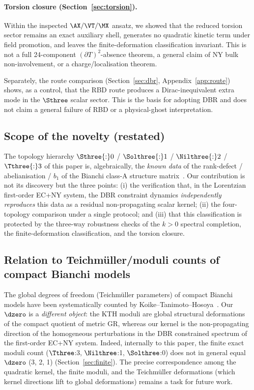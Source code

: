\paragraph{Torsion closure (Section~\ref{sec:torsion}).}
Within the inspected $\AX/\VT/\MX$ ansatz, we showed that the reduced torsion
sector remains an exact auxiliary shell, generates no quadratic kinetic term
under field promotion, and leaves the finite-deformation classification
invariant.  This is not a full 24-component $(\partial T)^{2}$-absence theorem, a
general claim of NY bulk non-involvement, or a charge/localisation theorem.

\medskip
Separately, the route comparison (Section~\ref{sec:dbr},
Appendix~\ref{app:route}) shows, as a control, that the RBD route produces a
Dirac-inequivalent extra mode in the $\Sthree$ scalar sector.  This is the basis
for adopting DBR and does not claim a general failure of RBD or a physical-ghost
interpretation.

\subsection{Scope of the novelty (restated)}
\label{sec:discussion:novelty}

The topology hierarchy $\Sthree{:}0$ / $\Solthree{:}1$ / $\Nilthree{:}2$ /
$\Tthree{:}3$ of this paper is, algebraically, the \emph{known data} of the
rank-defect / abelianisation / $b_{1}$ of the Bianchi class-A structure
matrix~\cite{ref16,ref41,ref42}.  Our contribution is not its discovery but the three
points: (i) the verification that, in the Lorentzian first-order EC+NY system,
the DBR constraint dynamics \emph{independently reproduces} this data as a
residual non-propagating scalar kernel; (ii) the four-topology comparison under a
single protocol; and (iii) that this classification is protected by the
three-way robustness checks of the $k>0$ spectral completion, the
finite-deformation classification, and the torsion closure.

\subsection{Relation to Teichm\"uller/moduli counts of compact Bianchi models}
\label{sec:discussion:teichmuller}

The global degrees of freedom (Teichm\"uller parameters) of compact Bianchi
models have been systematically counted by
Koike--Tanimoto--Hosoya~\cite{ref24,ref25,ref26}.  Our $\dzero$ is a
\emph{different object}: the KTH moduli are global structural deformations of the
compact quotient of metric GR, whereas our kernel is the non-propagating
direction of the homogeneous perturbations in the DBR constrained spectrum of the
first-order EC+NY system.  Indeed, internally to this paper, the finite exact
moduli count ($\Tthree$:3, $\Nilthree$:1, $\Solthree$:0) does not in general equal
$\dzero$ (3, 2, 1) (Section~\ref{sec:finite}).  The precise correspondence among
the quadratic kernel, the finite moduli, and the Teichm\"uller deformations
(which kernel directions lift to global deformations) remains a task for future
work.

